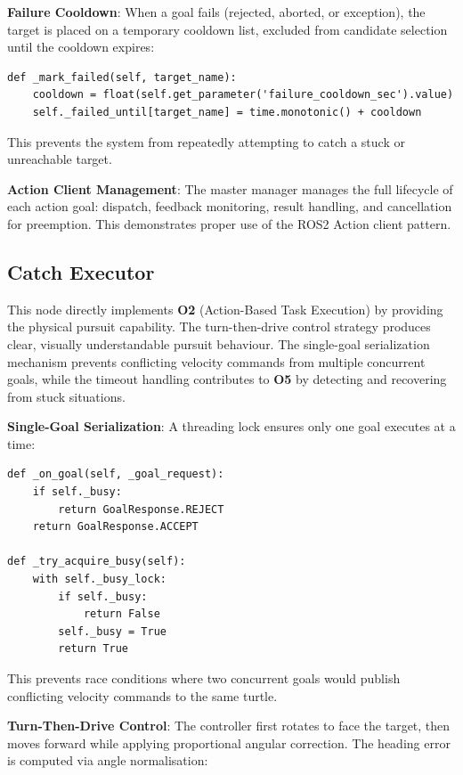 \documentclass{article}
\begin{document}
\begin{homeworkProblem}[3]
\textbf{Failure Cooldown}: When a goal fails (rejected, aborted, or exception), the target is placed on a temporary cooldown list, excluded from candidate selection until the cooldown expires:

\begin{verbatim}
def _mark_failed(self, target_name):
    cooldown = float(self.get_parameter('failure_cooldown_sec').value)
    self._failed_until[target_name] = time.monotonic() + cooldown
\end{verbatim}

This prevents the system from repeatedly attempting to catch a stuck or unreachable target.

\textbf{Action Client Management}: The master manager manages the full lifecycle of each action goal: dispatch, feedback monitoring, result handling, and cancellation for preemption. This demonstrates proper use of the ROS2 Action client pattern.

\subsection{Catch Executor}

This node directly implements \textbf{O2} (Action-Based Task Execution) by providing the physical pursuit capability. The turn-then-drive control strategy produces clear, visually understandable pursuit behaviour. The single-goal serialization mechanism prevents conflicting velocity commands from multiple concurrent goals, while the timeout handling contributes to \textbf{O5} by detecting and recovering from stuck situations.

\textbf{Single-Goal Serialization}: A threading lock ensures only one goal executes at a time:

\begin{verbatim}
def _on_goal(self, _goal_request):
    if self._busy:
        return GoalResponse.REJECT
    return GoalResponse.ACCEPT

def _try_acquire_busy(self):
    with self._busy_lock:
        if self._busy:
            return False
        self._busy = True
        return True
\end{verbatim}

This prevents race conditions where two concurrent goals would publish conflicting velocity commands to the same turtle.

\textbf{Turn-Then-Drive Control}: The controller first rotates to face the target, then moves forward while applying proportional angular correction. The heading error is computed via angle normalisation:


\end{homeworkProblem}
\end{document}
